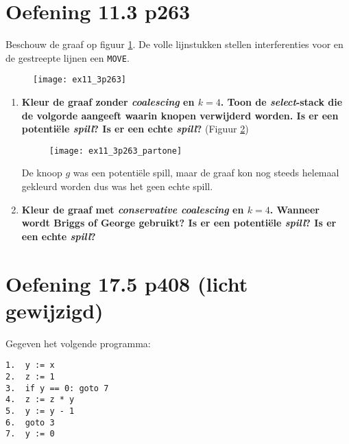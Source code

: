 \newpage
\section{Oefening 11.3 p263}
Beschouw de graaf op figuur \ref{fig:ex11_3p263}. De volle lijnstukken stellen interferenties voor en de gestreepte lijnen een \texttt{MOVE}.
\begin{figure}[ht]
	\centering
	\texttt{[image: ex11\_3p263]}
	\caption{}
	\label{fig:ex11_3p263}
\end{figure}

\begin{enumerate}
	\item \textbf{Kleur de graaf zonder \textit{coalescing} en $k = 4$. Toon de \textit{select}-stack die de volgorde aangeeft waarin knopen verwijderd worden. Is er een potentiële \textit{spill}? Is er een echte \textit{spill}?} (Figuur \ref{fig:ex11_3p263_partone})
	\begin{figure}
		\centering
		\texttt{[image: ex11\_3p263\_partone]}
		\caption{}
		\label{fig:ex11_3p263_partone}
	\end{figure}
	De knoop $g$ was een potentiële spill, maar de graaf kon nog steeds helemaal gekleurd worden dus was het geen echte spill.
	\item \textbf{Kleur de graaf met \textit{conservative coalescing} en $k = 4$. Wanneer wordt Briggs of George gebruikt?  Is er een potentiële \textit{spill}? Is er een echte \textit{spill}?}
\end{enumerate}


\newpage
\section{Oefening 17.5 p408 (licht gewijzigd)}
Gegeven het volgende programma:
\begin{lstlisting}
1.  y := x
2.  z := 1
3.  if y == 0: goto 7
4.  z := z * y
5.  y := y - 1
6.  goto 3
7.  y := 0
\end{lstlisting}

